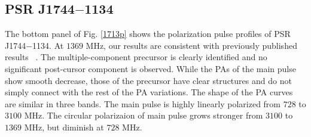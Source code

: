 \documentclass[useAMS,usenatbib]{mn2e}
\begin{document}

%


\subsection{PSR J1744$-$1134}

The bottom panel of Fig. \ref{1713p} shows the polarization pulse profiles of 
PSR J1744$-$1134.
%
At $1369$ MHz, our results are consistent with previously published results
~\citep{Yan11}.
%
The multiple-component precursor is clearly identified and no significant 
post-cursor component is observed.
%
While the PAs of the main pulse show smooth decrease, those of the precursor 
have clear structures and do not simply connect with the rest of the PA 
variations.
%
The shape of the PA curves are similar in three bands.
%
The main pulse is highly linearly polarized from $728$ to $3100$ MHz. 
The circular polarizaion of main pulse grows stronger from $3100$ to $1369$ MHz, 
but diminish at $728$ MHz.

\end{document}
